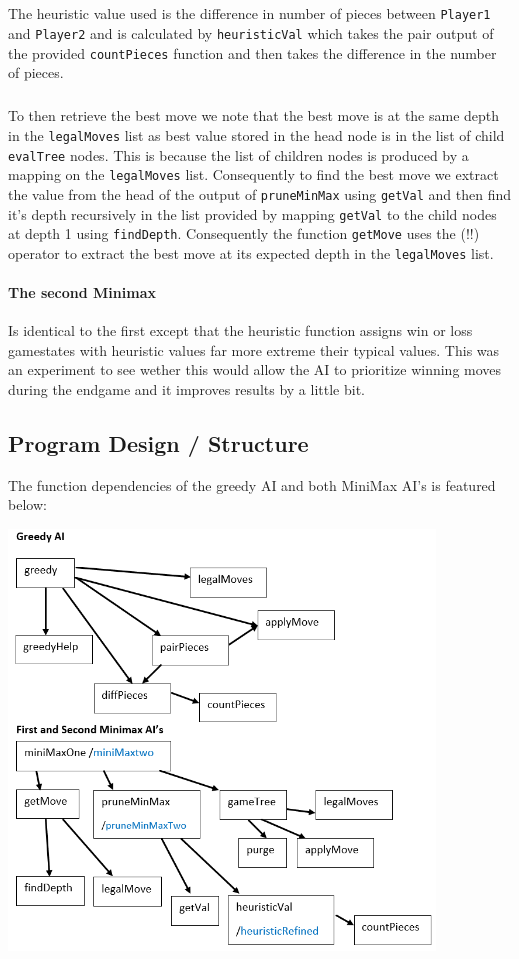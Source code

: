 \documentclass[11pt]{article}
\begin{document}
\subparagraph*{}The heuristic value used is the difference in number of pieces between \verb|Player1| and \verb|Player2| and is calculated by \verb|heuristicVal| which takes the pair output of the provided \verb|countPieces| function and then takes the difference in the number of pieces.

\subparagraph*{}To then retrieve the best move we note that the best move is at the same depth in the \verb|legalMoves| list as best value stored in the head node is in the list of child \verb|evalTree| nodes. This is because the list of children nodes is produced by a mapping on the \verb|legalMoves| list. Consequently to find the best move we extract the value from the head of the output of \verb|pruneMinMax| using \verb|getVal| and then find it's depth recursively in the list provided by mapping \verb|getVal| to the child nodes at depth 1 using \verb|findDepth|. Consequently the function \verb|getMove| uses the (!!) operator to extract the best move at its expected depth in the \verb|legalMoves| list.

\paragraph*{The second Minimax} Is identical to the first except that the heuristic function assigns win or loss gamestates with heuristic values far more extreme their typical values. This was an experiment to see wether this would allow the AI to prioritize winning moves during the endgame and it improves results by a little bit.

\newpage
\subsection{Program Design / Structure}
The function dependencies of the greedy AI and both MiniMax AI's is featured below:
\begin{center}
  \includegraphics[width=0.85\textwidth]{functDep.png}
\end{center}
\end{document}
